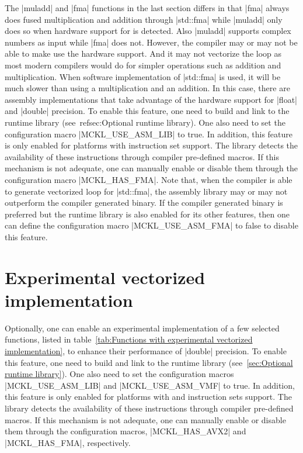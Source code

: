 The |muladd| and |fma| functions in the last section differs in that |fma|
always does fused multiplication and addition through |std::fma| while |muladd|
only does so when hardware support for  is detected. Also |muladd|
supports complex numbers as input while |fma| does not. However, the compiler
may or may not be able to make use the hardware support. And it may not
vectorize the loop as most modern \cpp compilers would do for simpler
operations such as addition and multiplication. When software implementation of
|std::fma| is used, it will be much slower than using a multiplication and an
addition. In this case, there are assembly implementations that take advantage
of the hardware support for |float| and |double| precision. To enable this
feature, one need to build and link to the runtime library
(see~ref{sec:Optional runtime library}). One also need to set the configuration
macro |MCKL_USE_ASM_LIB| to true. In addition, this feature is only enabled for
platforms with  instruction set support. The library detects the
availability of these instructions through compiler pre-defined macros. If this
mechanism is not adequate, one can manually enable or disable them through the
configuration macro |MCKL_HAS_FMA|. Note that, when the compiler is able to
generate vectorized loop for |std::fma|, the assembly library may or may not
outperform the compiler generated binary. If the compiler generated binary is
preferred but the runtime library is also enabled for its other features, then
one can define the configuration macro |MCKL_USE_ASM_FMA| to false to disable
this feature.

\section{Experimental vectorized implementation}
\label{sec:Experimental vectorized implementation}

Optionally, one can enable an experimental implementation of a few selected
functions, listed in table~\ref{tab:Functions with experimental vectorized
  implementation}, to enhance their performance of |double| precision. To
enable this feature, one need to build and link to the runtime library
(see~\ref{sec:Optional runtime library}). One also need to set the
configuration macros |MCKL_USE_ASM_LIB| and |MCKL_USE_ASM_VMF| to true. In
addition, this feature is only enabled for platforms with  and 
instruction sets support. The library detects the availability of these
instructions through compiler pre-defined macros. If this mechanism is not
adequate, one can manually enable or disable them through the configuration
macros, |MCKL_HAS_AVX2| and |MCKL_HAS_FMA|, respectively.

